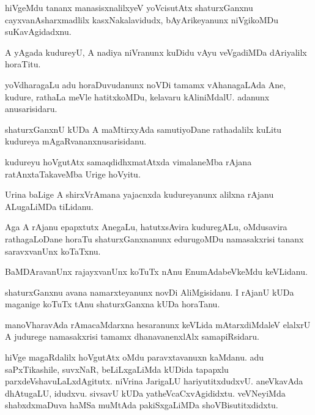 \documentclass{article}
\begin{document}
\begin{mn}%
hiVgeMdu tananx manasisxnalilxyeV yoVcisutAtx shaturxGanxnu cayxvanAsharxmadlilx 
kasxNakalavidudx, bAyArikeyanunx niVgikoMDu suKavAgidadxnu. 
\end{mn}

\begin{mn}%
A yAgada kudureyU, A nadiya niVranunx kuDidu vAyu veVgadiMDa dAriyalilx horaTitu.
\end{mn}

\begin{mn}%
yoVdharagaLu adu horaDuvudanunx noVDi tamamx vAhanagaLAda Ane, kudure, rathaLa meVle 
hatitxkoMDu, kelavaru kAliniMdalU. adanunx anusarisidaru.
\end{mn}

\begin{mn}%
shaturxGanxnU kUDa A maMtirxyAda samutiyoDane rathadalilx kuLitu kudureya 
mAgaRvananxnusarisidanu.
\end{mn}

\begin{mn}%
kudureyu hoVgutAtx samaqdidhxmatAtxda vimalaneMba rAjana ratAnxtaTakaveMba Urige hoVyitu.
\end{mn}

\begin{mn}%
Urina baLige A shirxVrAmana yajacnxda kudureyanunx alilxna rAjanu ALugaLiMDa tiLidanu.
\end{mn}

\begin{mn}%
Aga A rAjanu epapxtutx AnegaLu, hatutxsAvira kuduregALu, oMdusavira rathagaLoDane horaTu 
shaturxGanxnanunx edurugoMDu namasakxrisi tananx saravxvanUnx koTaTxnu.
\end{mn}

\begin{mn}%
BaMDAravanUnx rajayxvanUnx koTuTx nAnu EnumAdabeVkeMdu keVLidanu.
\end{mn}

\begin{mn}%
shaturxGanxnu avana namarxteyanunx novDi AliMgisidanu. I rAjanU kUDa maganige koTuTx tAnu 
shaturxGanxna kUDa horaTanu.
\end{mn}

\begin{mn}%
manoVharavAda rAmacaMdarxna hesaranunx keVLida mAtarxdiMdaleV elalxrU A judurege 
namasakxrisi tamamx dhanavanenxlAlx samapiRsidaru.
\end{mn}

\begin{mn}%
hiVge magaRdalilx hoVgutAtx oMdu paravxtavanuxn kaMdanu. adu saPxTikashile, suvxNaR, 
beLiLxgaLiMda kUDida tapapxlu parxdeVshavuLaLxdAgitutx. niVrina JarigaLU hariyutitxdudxvU. 
aneVkavAda dhAtugaLU, idudxvu. sivsavU kUDa yatheVcaCxvAgididxtu. veVNeyiMda shabxdxmaDuva 
haMSa muMtAda pakiSxgaLiMDa shoVBisutitxdidxtu.
\end{mn}
\end{document}
